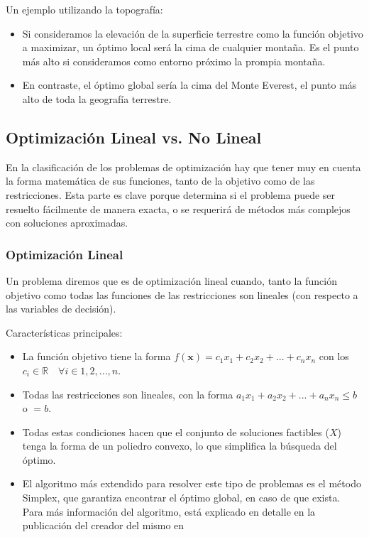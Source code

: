 \documentclass[12pt,a4paper]{book}
\begin{document}
Un ejemplo utilizando la topografía:
\begin{itemize}
    \item Si consideramos la elevación de la superficie terrestre como la función objetivo a maximizar, un óptimo local será la cima de cualquier montaña. Es el punto más alto si consideramos como entorno próximo la prompia montaña.
    \item En contraste, el óptimo global sería la cima del Monte Everest, el punto más alto de toda la geografía terrestre.
\end{itemize}

\subsection{Optimización Lineal vs. No Lineal}

En la clasificación de los problemas de optimización hay que tener muy en cuenta la forma matemática de sus funciones, tanto de la objetivo como de las restricciones. Esta parte es clave porque determina si el problema puede ser resuelto fácilmente de manera exacta, o se requerirá de métodos más complejos con soluciones aproximadas.

\subsubsection{Optimización Lineal}
Un problema diremos que es de optimización lineal cuando, tanto la función objetivo como todas las funciones de las restricciones son lineales (con respecto a las variables de decisión). 

Características principales:
\begin{itemize}
    \item La función objetivo tiene la forma $f(\mathbf{x})=c_1x_1+c_2x_2+...+c_nx_n$ con los $c_i \in \mathbb{R} \quad \forall i \in 1,2,...,n$.
    \item Todas las restricciones son lineales, con la forma $a_1x_1+a_2x_2+...+a_nx_n\leq b$ o $=b$.
    \item Todas estas condiciones hacen que el conjunto de soluciones factibles ($X$) tenga la forma de un poliedro convexo, lo que simplifica la búsqueda del óptimo.
    \item El algoritmo más extendido para resolver este tipo de problemas es el método Simplex, que garantiza encontrar el óptimo global, en caso de que exista. Para más información del algoritmo, está explicado en detalle en la publicación del creador del mismo en \cite{Dantzig1951}
\end{itemize}
\end{document}
